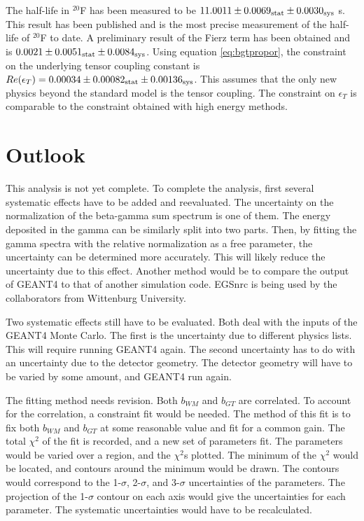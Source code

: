 \documentclass[../MaxHughesThesis.tex]{subfiles}
\begin{document}
The half-life in $^{20}$F has been measured to be  $11.0011 \pm   0.0069_{\rm{stat}}  \pm 0.0030_{\rm{sys}}$ s.
This result has been published and is the most precise measurement of the half-life of $^{20}$F to date.
A preliminary result of the Fierz term has been obtained and is $0.0021 \pm 0.0051_{\rm{stat}} \pm 0.0084_{\rm{sys}}$.
Using equation \ref{eq:bgtpropor}, the constraint on the underlying tensor coupling constant is $Re(\epsilon_{T}) = 0.00034 \pm 0.00082_{\rm{stat}} \pm 0.00136_{\rm{sys}}$.
This assumes that the only new physics beyond the standard model is the tensor coupling. 
The constraint on $\epsilon_{T}$ is comparable to the constraint obtained with high energy methods.

\section{Outlook}
This analysis is not yet complete.
To complete the analysis, first several systematic effects have to be added and reevaluated.
The uncertainty on the normalization of the beta-gamma sum spectrum is one of them. 
The energy deposited in the gamma can be similarly split into two parts.
Then, by fitting the gamma spectra with the relative normalization as a free parameter, the uncertainty can be determined more accurately.
This will likely reduce the uncertainty due to this effect.
Another method would be to compare the output of GEANT4 to that of another simulation code.
EGSnrc is being used by the collaborators from Wittenburg University. 

Two systematic effects still have to be evaluated.
Both deal with the inputs of the GEANT4 Monte Carlo.
The first is the uncertainty due to different physics lists. 
This will require running GEANT4 again.
The second uncertainty has to do with an uncertainty due to the detector geometry.
The detector geometry will have to be varied by some amount, and GEANT4 run again.

The fitting method needs revision.
Both $b_{WM}$ and $b_{GT}$ are correlated.
To account for the correlation, a constraint fit would be needed.
The method of this fit is to fix both $b_{WM}$ and $b_{GT}$ at some reasonable value and fit for a common gain.
The total $\chi^{2}$ of the fit is recorded, and a new set of parameters fit. 
The parameters would be varied over a region, and the $\chi^{2}$s plotted.
The minimum of the $\chi^{2}$ would be located, and contours around the minimum would be drawn. 
The contours would correspond to the 1-$\sigma$, 2-$\sigma$, and 3-$\sigma$ uncertainties of the parameters. 
The projection of the 1-$\sigma$ contour on each axis would give the uncertainties for each parameter.
The systematic uncertainties would have to be recalculated.
\end{document}
